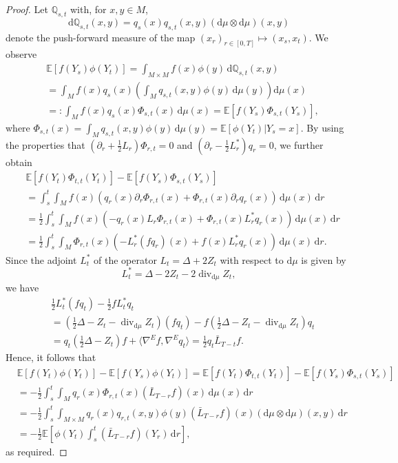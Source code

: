 \documentclass[10pt]{amsart}
\theoremstyle{remark}
\newcommand{\E}{\mathbb{E}}
\DeclareMathOperator{\dv}{div}
\newcommand{\qq}{\mathbb{Q}}
\newcommand{\dd}{\,{\mathrm d}}
\newcommand{\db}{{\mathrm d}}
\numberwithin{equation}{section}
\begin{document}
\begin{proof}
Let $\qq_{s,t}$ with, for $x,y\in M$,
$$\db\qq_{s,t}(x,y)=q_s(x)q_{s,t}(x,y) \left(\db\mu \otimes \db\mu\right)(x,y)$$
denote the push-forward measure of the map $(x_{r})_{r \in [0,T]} \mapsto (x_s,x_t)$. We observe
\begin{align*}
& \E\left[ f(Y_s) \phi(Y_t) \right] = \int_{M \times M} f(x) \phi(y) \dd\qq_{s,t}(x,y) \\
& = \int_M f(x) q_s(x) \left( \int_M q_{s,t}(x,y) \phi(y) \dd\mu(y) \right) \db\mu(x) \\
& =: \int_M f(x) q_s(x) \Phi_{s,t}(x) \dd\mu(x) = \E\left[ f(Y_s) \Phi_{s,t}(Y_s) \right],
\end{align*}
where $\Phi_{s,t}(x) = \int_M q_{s,t}(x,y) \phi(y) \dd\mu(y) = \E[\phi(Y_t)| Y_s = x]$.
By using the properties that $(\partial_r + \frac{1}{2}L_r) \Phi_{r,t} =0$ and $(\partial_r - \frac{1}{2}L_r^*) q_r =0$, we further obtain
\begin{align*}
& \E[f(Y_t) \Phi_{t,t}(Y_t)] - \E[f(Y_s) \Phi_{s,t}(Y_s)]\\
&=\int_s^t\int_M f(x)(q_r(x)\partial_r\Phi_{r,t}(x) + \Phi_{r,t}(x)\partial_r q_r(x))\dd \mu(x)\dd r\\ 
&=\frac{1}{2}\int_s^t \int_M f(x)(-q_r(x)  L_r \Phi_{r,t}(x) + \Phi_{r,t}(x) L_r^* q_r(x))\dd\mu(x)\dd r\\
&=\frac{1}{2}\int_s^t \int_M  \Phi_{r,t}(x) (- L_r^*( f q_r)(x)   + f(x) L_r^* q_r(x))\dd\mu(x)\dd r.
\end{align*}
Since the adjoint $L^*_t$ of the operator $L_t=\Delta+2Z_t$ with respect to $\db\mu$ is given by
$$L^*_t = \Delta - 2Z_t - 2\dv_{\db\mu} Z_t,$$
we have
\begin{align*}
& \frac{1}{2}L^*_t(fq_t) - \frac{1}{2}fL^*_t q_t\\
& = \left(\frac{1}{2}\Delta  - Z_t - \dv_{\db\mu} Z_t\right) (fq_t) - f \left(\frac{1}{2}\Delta  - Z_t - \dv_{\db\mu} Z_t\right) q_t \\
& = q_t \left(\frac{1}{2}\Delta - Z_t\right) f +\langle \nabla^E f, \nabla^E q_t \rangle
= \frac{1}{2}q_t \bar{L}_{T-t} f.
\end{align*}
Hence, it follows that
\begin{align*}
& \E[f(Y_t) \phi(Y_t)] - \E[f(Y_s) \phi(Y_t)]=
  \E[f(Y_t) \Phi_{t,t}(Y_t)] - \E[f(Y_s) \Phi_{s,t}(Y_s)]\\
&= -\frac{1}{2}\int_s^t \int_M q_r(x) \Phi_{r,t}(x) (\bar{L}_{T-r}f)(x)\dd\mu(x)\dd r \\
&= -\frac{1}{2}\int_s^t \int_{M\times M} q_r(x) q_{r,t}(x,y) \phi(y) (\bar{L}_{T-r}f)(x) (\db\mu \otimes \db\mu)(x,y) \dd r \\
& = - \frac{1}{2}\E\left[ \phi(Y_t) \int_s^t (\bar{L}_{T-r}f)(Y_r) \dd r \right],
\end{align*}
as required.
\end{proof}
\end{document}
